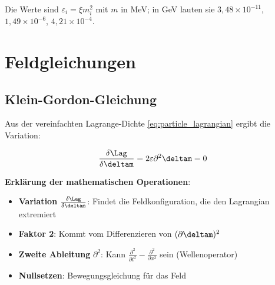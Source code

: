 	\begin{table}[htbp]
		\centering
		\caption{Vereinheitlichte Beschreibung der Leptonfamilie}
		\label{tab:lepton_parameters}
	\end{table}
	Die Werte sind $\varepsilon_i = \xi m_i^2$ mit $m$ in MeV; in GeV lauten sie $3{,}48\times10^{-11}$, $1{,}49\times10^{-6}$, $4{,}21\times10^{-4}$.
	
	\section{Feldgleichungen}
	
	\subsection{Klein-Gordon-Gleichung}
	
	Aus der vereinfachten Lagrange-Dichte \eqref{eq:particle_lagrangian} ergibt die Variation:
	
	\begin{equation}
		\frac{\delta \Lag}{\delta \deltam} = 2\varepsilon \partial^2 \deltam = 0
	\end{equation}
	
	\textbf{Erklärung der mathematischen Operationen}:
	\begin{itemize}
		\item \textbf{Variation} $\frac{\delta \Lag}{\delta \deltam}$: Findet die Feldkonfiguration, die den Lagrangian extremiert
		\item \textbf{Faktor 2}: Kommt vom Differenzieren von $(\partial \deltam)^2$
		\item \textbf{Zweite Ableitung} $\partial^2$: Kann $\frac{\partial^2}{\partial t^2} - \frac{\partial^2}{\partial x^2}$ sein (Wellenoperator)
		\item \textbf{Nullsetzen}: Bewegungsgleichung für das Feld
	\end{itemize}
	
